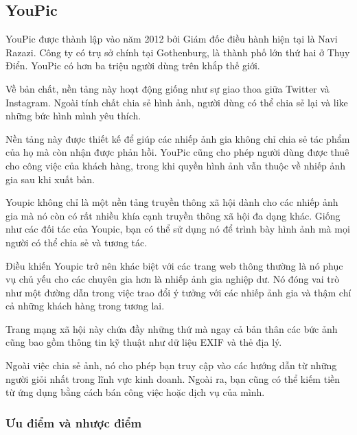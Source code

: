 \par 

\subsection{YouPic}
YouPic được thành lập vào năm 2012 bởi Giám đốc điều hành hiện tại là Navi Razazi. 
Công ty có trụ sở chính tại Gothenburg, là thành phố lớn thứ hai ở Thụy Điển. 
YouPic có hơn ba triệu người dùng trên khắp thế giới.\par

Về bản chất, nền tảng này hoạt động giống như sự giao thoa giữa Twitter và Instagram. 
Ngoài tính chất chia sẻ hình ảnh, người dùng có thể chia sẻ lại và like những bức hình mình yêu thích.\par

Nền tảng này được thiết kế để giúp các nhiếp ảnh gia không chỉ chia sẻ tác phẩm của họ mà còn nhận được phản hồi. 
YouPic cũng cho phép người dùng được thuê cho công việc của khách hàng, trong khi quyền hình ảnh vẫn thuộc 
về nhiếp ảnh gia sau khi xuất bản.\par

Youpic không chỉ là một nền tảng truyền thông xã hội dành cho các nhiếp ảnh gia mà nó còn có rất nhiều 
khía cạnh truyền thông xã hội đa dạng khác. Giống như các đối tác của Youpic, bạn có thể sử dụng nó để trình
 bày hình ảnh mà mọi người có thể chia sẻ và tương tác.\par

Điều khiến Youpic trở nên khác biệt với các trang web thông thường là nó phục vụ chủ yếu cho các chuyên
 gia hơn là nhiếp ảnh gia nghiệp dư. Nó đóng vai trò như một đường dẫn trong việc trao đổi ý tưởng với các 
 nhiếp ảnh gia và thậm chí cả những khách hàng trong tương lai.\par

Trang mạng xã hội này chứa đầy những thứ mà ngay cả bản thân các bức ảnh cũng bao gồm thông tin kỹ thuật như 
dữ liệu EXIF và thẻ địa lý.\par

Ngoài việc chia sẻ ảnh, nó cho phép bạn truy cập vào các hướng dẫn từ những người giỏi nhất trong lĩnh vực kinh 
doanh. Ngoài ra, bạn cũng có thể kiếm tiền từ ứng dụng bằng cách bán công việc hoặc dịch vụ của mình.\par


\subsubsection{Ưu điểm và nhược điểm}
